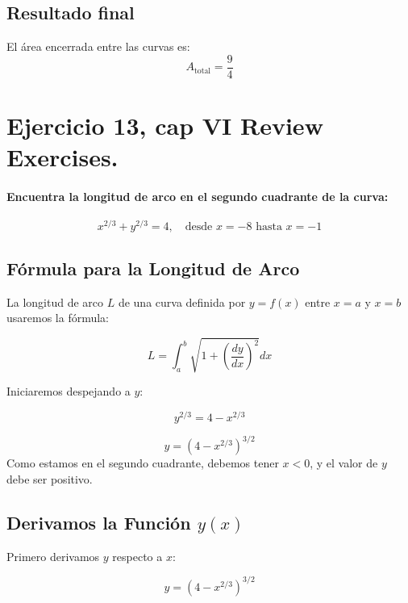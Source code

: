 \documentclass[11pt,letterpaper]{article}
\begin{document}
\subsection*{Resultado final}
El área encerrada entre las curvas es:
\[
\boxed{A_{\text{total}} = \frac{9}{4}}
\]

\section{Ejercicio 13, cap VI Review Exercises.}
\paragraph*{Encuentra la longitud de arco en el segundo cuadrante de la curva:}
\begin{equation*}
    x^{2/3} + y^{2/3} = 4, \quad \text{desde } x = -8 \text{ hasta } x = -1
\end{equation*}

\subsection*{Fórmula para la Longitud de Arco}
La longitud de arco $L$ de una curva definida por $y = f(x)$ entre $x = a$ y $x = b$ usaremos la f\'ormula:

\begin{equation*}
  L = \int_{a}^{b} \sqrt{1 + \left(\frac{dy}{dx}\right)^2} dx
\end{equation*}

Iniciaremos despejando a $y$:

\begin{equation*}
  y^{2/3} = 4 - x^{2/3}
\end{equation*}

\begin{equation*}
  y = \left( 4 - x^{2/3} \right)^{3/2}
\end{equation*}
Como estamos en el segundo cuadrante, debemos tener $x < 0$, y el valor de $y$ debe ser positivo.

\subsection*{Derivamos la Función $y(x)$}
Primero derivamos $y$ respecto a $x$:

\begin{equation*}
  y = \left( 4 - x^{2/3} \right)^{3/2}
\end{equation*}
\end{document}
